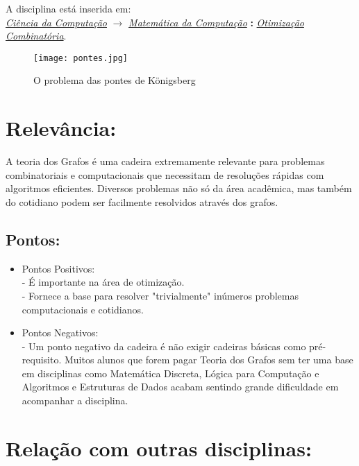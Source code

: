 \documentclass[10pt]{article}
\begin{document}
A disciplina está inserida em:\\
\underline{\emph{Ciência da Computação}} $\rightarrow$ \underline{\emph{Matemática da Computação}} \textbf{:} \underline{\emph{Otimização Combinatória}}.

\begin{figure}[h]
    \centering %
    \texttt{[image: pontes.jpg]}
    \caption{O problema das pontes de Königsberg}
    \label{fig:my_label}
\end{figure}

\section{Relevância:}
A teoria dos Grafos é uma cadeira extremamente relevante para problemas combinatoriais e computacionais que necessitam de resoluções rápidas com algoritmos eficientes. Diversos problemas não só da área acadêmica, mas também do cotidiano  podem ser facilmente resolvidos através dos grafos.
\subsection{Pontos:}
\begin{itemize}
    \item Pontos Positivos: \\
    - É importante na área de otimização.\\
    - Fornece a base para resolver "trivialmente" inúmeros problemas computacionais e cotidianos.
    \item Pontos Negativos:\\
    - Um ponto negativo da cadeira é não exigir cadeiras básicas como pré-requisito. Muitos alunos que forem pagar Teoria dos Grafos sem ter uma base em disciplinas como Matemática Discreta, Lógica para Computação e Algoritmos e Estruturas de Dados acabam sentindo grande dificuldade em acompanhar a disciplina.
\end{itemize}


\section{Relação com outras disciplinas:}
\end{document}

